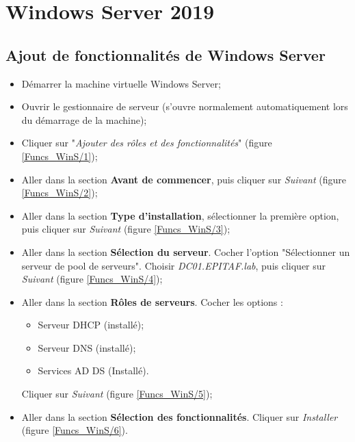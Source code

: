 \section{Windows Server 2019}

\subsection{Ajout de fonctionnalités de Windows Server}

\begin{itemize}
    \item Démarrer la machine virtuelle Windows Server;
    \item Ouvrir le gestionnaire de serveur (s'ouvre normalement automatiquement lors du démarrage de la machine);
    \item Cliquer sur "\textit{Ajouter des rôles et des fonctionnalités}" (figure \ref{Funcs_WinS/1});
    \item Aller dans la section \textbf{Avant de commencer}, puis cliquer sur \textit{Suivant} (figure \ref{Funcs_WinS/2});
    \item Aller dans la section \textbf{Type d'installation}, sélectionner la première option, puis cliquer sur \textit{Suivant} (figure \ref{Funcs_WinS/3});
    \item Aller dans la section \textbf{Sélection du serveur}. Cocher l'option "Sélectionner un serveur de pool de serveurs". Choisir \textit{DC01.EPITAF.lab}, puis cliquer sur \textit{Suivant} (figure \ref{Funcs_WinS/4});
    \item Aller dans la section \textbf{Rôles de serveurs}. Cocher les options :
    \begin{itemize}
        \item Serveur DHCP (installé);
        \item Serveur DNS (installé);
        \item Services AD DS (Installé).
    \end{itemize}
    Cliquer sur \textit{Suivant} (figure \ref{Funcs_WinS/5});
    \item Aller dans la section \textbf{Sélection des fonctionnalités}. Cliquer sur \textit{Installer} (figure \ref{Funcs_WinS/6}).
\end{itemize}

